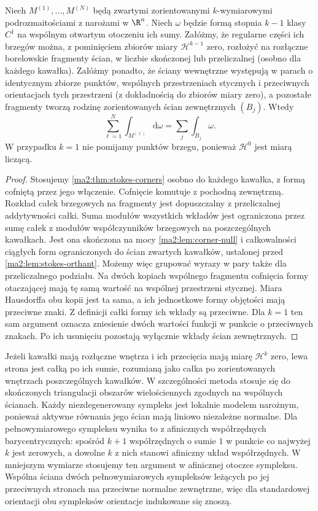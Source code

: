 \begin{stwierdzenie}
\label{ma2:prop:stokes-gluing}
Niech $M^{(1)},\ldots,M^{(N)}$ będą zwartymi
zorientowanymi $k$-wymiarowymi podrozmaitościami
z narożami w $\R^n$. Niech $\omega$ będzie
formą stopnia $k-1$ klasy $C^1$ na wspólnym
otwartym otoczeniu ich sumy.
Załóżmy, że regularne części ich brzegów
można, z pominięciem zbiorów miary
$\mathcal H^{k-1}$ zero, rozłożyć na rozłączne
borelowskie fragmenty ścian, w liczbie skończonej
lub przeliczalnej (osobno dla każdego kawałka).
Załóżmy ponadto, że ściany wewnętrzne
występują w parach o identycznym zbiorze
punktów, wspólnych przestrzeniach stycznych
i przeciwnych orientacjach tych przestrzeni
(z dokładnością do zbiorów miary zero),
a pozostałe fragmenty tworzą rodzinę
zorientowanych ścian zewnętrznych $(B_j)$.
Wtedy
\[
 \sum_{\ell=1}^N\int_{M^{(\ell)}}\mathrm d\omega
 =\sum_j\int_{B_j}\omega.
\]
W przypadku $k=1$ nie pomijamy punktów
brzegu, ponieważ $\mathcal H^0$ jest miarą liczącą.
\end{stwierdzenie}
\begin{proof}
Stosujemy \ref{ma2:thm:stokes-corners}
osobno do każdego kawałka, z formą
cofniętą przez jego włączenie.
Cofnięcie komutuje z pochodną zewnętrzną.
Rozkład całek brzegowych na fragmenty
jest dopuszczalny z przeliczalnej addytywności
całki. Suma modułów wszystkich wkładów
jest ograniczona przez sumę całek z modułów
współczynników brzegowych na poszczególnych
kawałkach. Jest ona skończona na mocy
\ref{ma2:lem:corner-null} i całkowalności
ciągłych form ograniczonych do ścian
zwartych kawałków, ustalonej przed
\ref{ma2:lem:stokes-orthant}.
Możemy więc grupować wyrazy w pary
także dla przeliczalnego podziału.
Na dwóch kopiach wspólnego fragmentu
cofnięcia formy otaczającej mają tę samą
wartość na wspólnej przestrzeni stycznej.
Miara Hausdorffa obu kopii jest ta sama,
a ich jednostkowe formy objętości mają
przeciwne znaki. Z definicji całki formy
ich wkłady są przeciwne. Dla $k=1$ ten
sam argument oznacza zniesienie dwóch
wartości funkcji w punkcie o przeciwnych znakach.
Po ich usunięciu pozostają wyłącznie
wkłady ścian zewnętrznych.
\end{proof}

Jeżeli kawałki mają rozłączne wnętrza
i ich przecięcia mają miarę $\mathcal H^k$ zero,
lewa strona jest całką po ich sumie,
rozumianą jako całka po zorientowanych
wnętrzach poszczególnych kawałków.
W szczególności metoda stosuje się do
skończonych triangulacji obszarów wielościennych
zgodnych na wspólnych ścianach.
Każdy niezdegenerowany sympleks jest lokalnie
modelem narożnym, ponieważ aktywne równania
jego ścian mają liniowo niezależne normalne.
Dla pełnowymiarowego sympleksu wynika to
z afinicznych współrzędnych barycentrycznych:
spośród $k+1$ współrzędnych o sumie $1$
w punkcie co najwyżej $k$ jest zerowych,
a dowolne $k$ z nich stanowi afiniczny
układ współrzędnych. W mniejszym wymiarze
stosujemy ten argument w afinicznej
otoczce sympleksu.
Wspólna ściana dwóch pełnowymiarowych
sympleksów leżących po jej przeciwnych
stronach ma przeciwne normalne zewnętrzne,
więc dla standardowej orientacji obu
sympleksów orientacje indukowane się znoszą.

